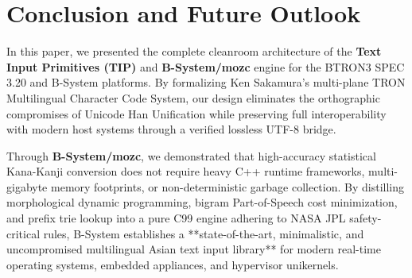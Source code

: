 \documentclass[10pt,journal,compsoc,twocolumn]{article}
\begin{document}
\section{Conclusion and Future Outlook}
\label{sec:conclusion}

In this paper, we presented the complete cleanroom architecture of the \textbf{Text Input Primitives (TIP)} and \textbf{B-System/mozc} engine for the BTRON3 SPEC 3.20 and B-System platforms. By formalizing Ken Sakamura's multi-plane TRON Multilingual Character Code System, our design eliminates the orthographic compromises of Unicode Han Unification while preserving full interoperability with modern host systems through a verified lossless UTF-8 bridge.

Through \textbf{B-System/mozc}, we demonstrated that high-accuracy statistical Kana-Kanji conversion does not require heavy C++ runtime frameworks, multi-gigabyte memory footprints, or non-deterministic garbage collection. By distilling morphological dynamic programming, bigram Part-of-Speech cost minimization, and prefix trie lookup into a pure C99 engine adhering to NASA JPL safety-critical rules, B-System establishes a **state-of-the-art, minimalistic, and uncompromised multilingual Asian text input library** for modern real-time operating systems, embedded appliances, and hypervisor unikernels.
\end{document}
